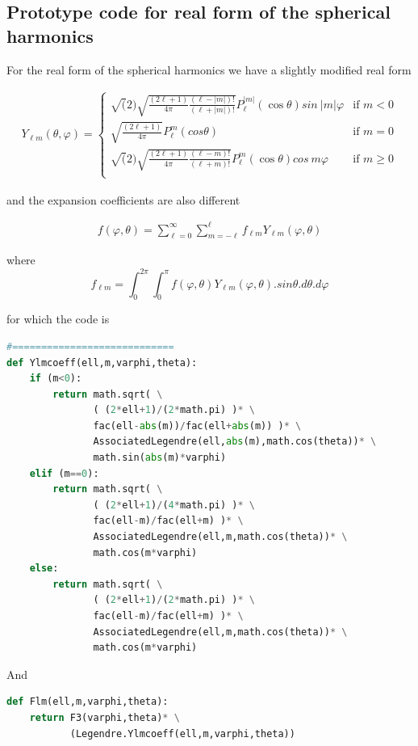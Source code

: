 \documentclass[11pt,letterpaper,titlepage]{article}
\newcommand{\beqn}{\begin{equation}
	\begin{aligned}}
\newcommand{\eeqn}{\end{aligned}
	\end{equation}}
\numberwithin{equation}{section}
\begin{document}
\begin{appendices}
\subsection{Prototype code for real form of the spherical harmonics}
For the real form of the spherical harmonics we have a slightly modified real form 

\beqn
Y_{\ell m} (\theta, \varphi )=
\begin{cases}
 \sqrt(2)\sqrt{ \frac{(2\ell + 1)}{4\pi}   \frac{(\ell-|m|)!}{(\ell+|m|)!}}P_{\ell}^{|m|}(\cos\theta)sin\ {|m|\varphi}
& \text{if } m < 0 \\
\sqrt{ \frac{(2\ell + 1)}{4\pi}} P_{\ell}^{m}(cos\theta) & \text{if } m = 0 \\
 \sqrt(2)\sqrt{ \frac{(2\ell + 1)}{4\pi}   \frac{(\ell-m)!}{(\ell+m)!}}P_{\ell}^{m}(\cos\theta)cos\ {m\varphi}
& \text{if } m \ge 0 \\
\end{cases}
\eeqn

and the expansion coefficients are also different

\beqn 
f(\varphi,\theta) = \sum_{\ell = 0}^\infty \sum_{m=-\ell}^{\ell} f_{\ell m} Y_{\ell m}(\varphi,\theta)
\eeqn 

where
$$
f_{\ell m} = \int_{0}^{2\pi} \int_0^\pi f(\varphi,\theta)Y_{\ell m}(\varphi,\theta).sin\theta.d\theta.d\varphi
$$

for which the code is

\begin{lstlisting}[language=python]
#============================    
def Ylmcoeff(ell,m,varphi,theta):
    if (m<0):
        return math.sqrt( \
               ( (2*ell+1)/(2*math.pi) )* \
               fac(ell-abs(m))/fac(ell+abs(m)) )* \
               AssociatedLegendre(ell,abs(m),math.cos(theta))* \
               math.sin(abs(m)*varphi)
    elif (m==0):
        return math.sqrt( \
               ( (2*ell+1)/(4*math.pi) )* \
               fac(ell-m)/fac(ell+m) )* \
               AssociatedLegendre(ell,m,math.cos(theta))* \
               math.cos(m*varphi)
    else:
        return math.sqrt( \
               ( (2*ell+1)/(2*math.pi) )* \
               fac(ell-m)/fac(ell+m) )* \
               AssociatedLegendre(ell,m,math.cos(theta))* \
               math.cos(m*varphi)
\end{lstlisting}

And

\begin{lstlisting}[language=python]
def Flm(ell,m,varphi,theta):
    return F3(varphi,theta)* \
           (Legendre.Ylmcoeff(ell,m,varphi,theta))
           

\end{lstlisting}
\end{appendices}
\end{document}
